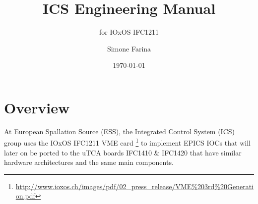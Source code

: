 \documentclass[11pt
  , a4paper
  , article
  , oneside
  , showtrims
]{memoir}
\begin{document}


\date{\today}




\title{ICS Engineering Manual}
\subtitle{for IOxOS IFC1211}
\author{Simone Farina }



\showtrimson

\esstitle
\newpage
\tableofcontents
\newpage



\chapter{Overview}
At European Spallation Source (ESS), the Integrated Control System (ICS) group uses the IOxOS IFC1211 VME card {\footnote{\url{http://www.ioxos.ch/images/pdf/02_press_release/VME\%203rd\%20Generation.pdf}}} to implement EPICS IOCs that will later on be ported to the uTCA boards IFC1410 \& IFC1420 that have similar hardware architectures and the same main components.
\end{document}
